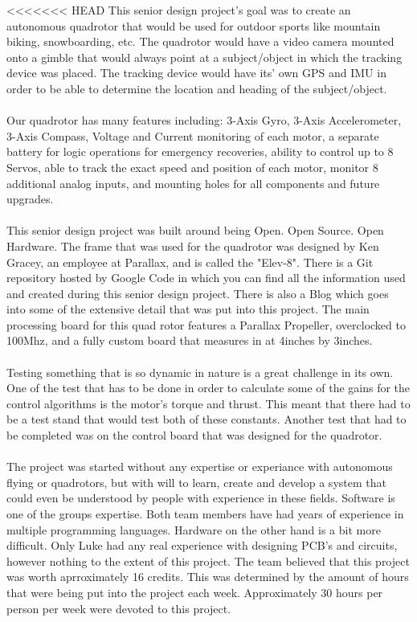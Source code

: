 \documentclass{article}
\numberwithin{equation}{section} %
\begin{document}
<<<<<<< HEAD
This senior design project's goal was to create an autonomous quadrotor that would be used for outdoor sports like mountain biking, snowboarding, etc. The quadrotor would have a video camera mounted onto a gimble that would always point at a subject/object in which the tracking device was placed. The tracking device would have its' own GPS and IMU in order to be able to determine the location and heading of the subject/object.\\ \\
Our quadrotor has many features including: 3-Axis Gyro, 3-Axis Accelerometer, 3-Axis Compass, Voltage and Current monitoring of each motor, a separate battery for logic operations for emergency recoveries, ability to control up to 8 Servos, able to track the exact speed and position of each motor, monitor 8 additional analog inputs, and mounting holes for all components and future upgrades. \\ \\
This senior design project was built around being Open. Open Source. Open Hardware. The frame that was used for the quadrotor was designed by Ken Gracey, an employee at Parallax, and is called the "Elev-8". There is a Git repository hosted by Google Code in which you can find all the information used and created during this senior design project. There is also a Blog which goes into some of the extensive detail that was put into this project. The main processing board for this quad rotor features a Parallax Propeller, overclocked to 100Mhz, and a fully custom board that measures in at 4inches by 3inches. \\ \\
Testing something that is so dynamic in nature is a great challenge in its own. One of the test that has to be done in order to calculate some of the gains for the control algorithms is the motor's torque and thrust. This meant that there had to be a test stand that would test both of these constants. Another test that had to be completed was on the control board that was designed for the quadrotor. \\ \\
The project was started without any expertise or experiance with autonomous flying or quadrotors, but with will to learn, create and develop a system that could even be understood by people with experience in these fields. Software is one of the groups expertise. Both team members have had years of experience in multiple programming languages. Hardware on the other hand is a bit more difficult. Only Luke had any real experience with designing PCB's and circuits, however nothing to the extent of this project. The team believed that this project was worth aprroximately 16 credits. This was determined by the amount of hours that were being put into the project each week. Approximately 30 hours per person per week were devoted to this project. \\ \\
\end{document}
